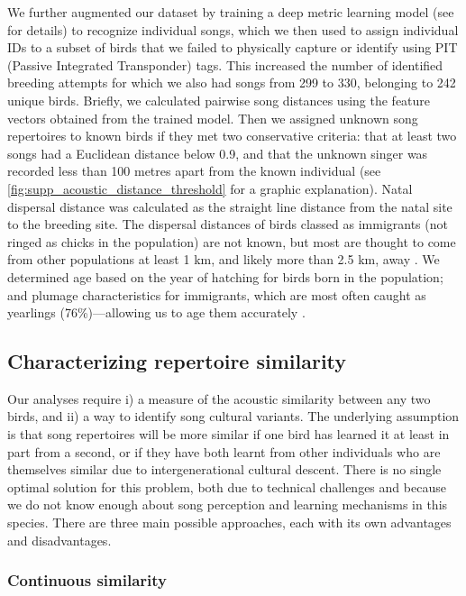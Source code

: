 We further augmented our dataset by training a deep metric learning model (see \parencite{merinorecalde2023a} for details) to recognize individual songs, which we then used to assign individual IDs to a subset of birds that we failed to physically capture or identify using PIT (Passive Integrated Transponder) tags. This increased the number of identified breeding attempts for which we also had songs from 299 to 330, belonging to 242 unique birds. Briefly, we calculated pairwise song distances using the feature vectors obtained from the trained model. Then we assigned unknown song repertoires to known birds if they met two conservative criteria: that at least two songs had a Euclidean distance below 0.9, and that the unknown singer was recorded less than 100 metres apart from the known individual (see \autoref{fig:supp_acoustic_distance_threshold} for a graphic explanation).
Natal dispersal distance was calculated as the straight line distance from the natal site to the breeding site. The dispersal distances of birds classed as immigrants (not ringed as chicks in the population) are not known, but most are thought to come from other populations at least 1 km, and likely more than 2.5 km, away \parencite{verhulst1997, quinn2011}. We determined age based on the year of hatching for birds born in the population; and plumage characteristics for immigrants, which are most often caught as yearlings (76\%)---allowing us to age them accurately \parencite{woodman2023}.

\subsection{Characterizing repertoire similarity}

Our analyses require i) a measure of the acoustic similarity between any two birds, and ii) a way to identify song cultural variants.  The underlying assumption is that song repertoires will be more similar if one bird has learned it at least in part from a second, or if they have both learnt from other individuals who are themselves similar due to intergenerational cultural descent. There is no single optimal solution for this problem, both due to technical challenges and because we do not know enough about song perception and learning mechanisms in this species. There are three main possible approaches, each with its own advantages and disadvantages.

\subsubsection{Continuous similarity}
\label{song-similarity}

